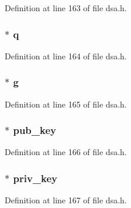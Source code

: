 Definition at line 163 of file dsa.\+h.

\subsubsection[{\texorpdfstring{q}{q}}]{$\ast$ q}\hypertarget{structdsa__st_a8d39f39e46b024184dc5a24c3901d32d}{}\label{structdsa__st_a8d39f39e46b024184dc5a24c3901d32d}


Definition at line 164 of file dsa.\+h.

\subsubsection[{\texorpdfstring{g}{g}}]{$\ast$ g}\hypertarget{structdsa__st_ada27d9fb07daaac14be19b4ce12a7400}{}\label{structdsa__st_ada27d9fb07daaac14be19b4ce12a7400}


Definition at line 165 of file dsa.\+h.

\subsubsection[{\texorpdfstring{pub\+\_\+key}{pub_key}}]{$\ast$ pub\+\_\+key}\hypertarget{structdsa__st_aad713005343ebfb84e09a7441d655802}{}\label{structdsa__st_aad713005343ebfb84e09a7441d655802}


Definition at line 166 of file dsa.\+h.

\subsubsection[{\texorpdfstring{priv\+\_\+key}{priv_key}}]{$\ast$ priv\+\_\+key}\hypertarget{structdsa__st_a7a27cca85dea48fc1c9086fe65651ec5}{}\label{structdsa__st_a7a27cca85dea48fc1c9086fe65651ec5}


Definition at line 167 of file dsa.\+h.

